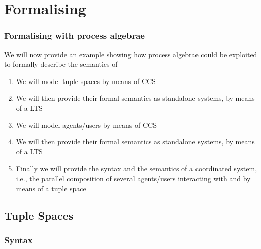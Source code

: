 \documentclass[presentation]{beamer}\mode<presentation>{\usetheme{AMSCesenaPurpleAndGold}}
\begin{document}
\section{Formalising \linda{}}

\begin{frame}
\frametitle{Formalising \linda{} with process algebrae}

    We will now provide an example showing how process algebrae could be exploited to formally describe the semantics of \linda{}
    \vfill
    \begin{enumerate}
        \item We will model tuple spaces by means of CCS
        
        \vfill
        
        \item We will then provide their formal semantics as standalone systems, by means of a LTS
        
        \vfill
        
        \item We will model agents/users by means of CCS
        
        \vfill
        
        \item We will then provide their formal semantics as standalone systems, by means of a LTS
        
        \vfill
        
        \item Finally we will provide the syntax and the semantics of a \alert{coordinated system}, i.e., the \alert{parallel composition} of several agents/users interacting with and by means of a tuple space
    \end{enumerate}
\end{frame}

\subsection{Tuple Spaces}

\subsubsection{Syntax}
\end{document}
